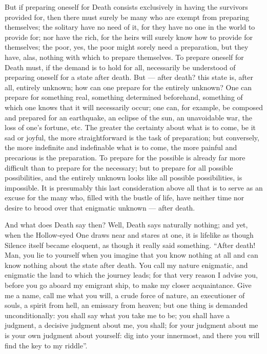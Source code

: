 \documentclass[12pt,a4paper,openany]{book}
\newcommand{\opage}[1]{\marginnote{\footnotesize\textit{[#1]}}}
\begin{document}
But if preparing oneself for Death consists exclusively
\setcounter{footnote}{0}%
\opage{195}in having the survivors provided for, then
there must surely be many who are exempt from preparing themselves;
the solitary have no need of it, for they have no one in the world
to provide for; nor have the rich, for the heirs will surely
know how to provide for themselves; the poor, yes, the poor might
sorely need a preparation, but they have, alas,
nothing with which to prepare themselves. To prepare oneself for
Death must, if the demand is to hold for all, necessarily
be understood of preparing oneself for a state after
death. But --- after death? this state is, after all, entirely
unknown; how can one prepare for
the entirely unknown? One can prepare for something
real, something determined beforehand, something of which one knows
that it will necessarily occur; one can, for example, be composed
and prepared for an earthquake, an eclipse of the sun,
an unavoidable war, the loss of one's fortune, etc. The
greater the certainty about what is to come, be it sad
or joyful, the more straightforward is the task
of preparation; but conversely, the more indefinite and indefinable
what is to come, the more painful and precarious is the
preparation. To prepare for the possible is
already far more difficult than to prepare for the
necessary; but to prepare for all possible possibilities,
and the entirely unknown looks like all possible
possibilities, is impossible. It is presumably this last consideration
above all that is to serve as an excuse for the many
who, filled with the bustle of life, have neither time nor
desire to brood over that enigmatic unknown ---
after death.

And what does Death say then? Well, Death says naturally
nothing; and yet, when the Hollow-eyed One draws near
\setcounter{footnote}{0}%
\opage{196}and stares at one, it is lifelike as though Silence
itself became eloquent, as though it really said something.
``After death! Man, you lie to yourself when you
imagine that you know nothing at all and can know nothing
about the state after death. You call my nature enigmatic,
and enigmatic the land to which the journey leads;
for that very reason I advise you, before you go aboard my
emigrant ship, to make my closer acquaintance. Give
me a name, call me what you will, a crude force of nature,
an executioner of souls, a spirit from hell, an emissary
from heaven; but one thing is demanded unconditionally: you shall say
what you take me to be; you shall have a judgment, a decisive judgment
about me, you shall; for your judgment about me is
your own judgment about yourself: dig into your innermost, and there you will find
the key to my riddle''.
\end{document}
